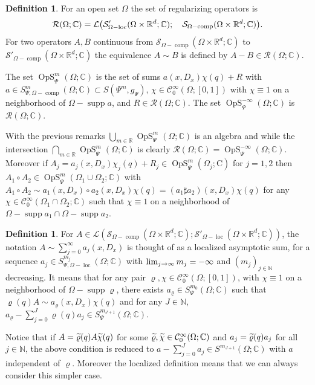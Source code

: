 \documentclass[10pt]{amsart}
\theoremstyle{definition}\newtheorem{defi}[theo]{Definition}\newtheorem{rema}[theo]{Remark}\newtheorem{exam}[theo]{Example}\newtheorem{exem}[theo]{Example}\newtheorem{nota}[theo]{Notation}
\newcommand{\C}{\mathbb{C}}
\newcommand{\R}{\mathbb{R}}
\newcommand{\N}{\mathbb{N}}
\newcommand{\rmC}{\mathrm{C}}
\newcommand{\clC}{\mathcal{C}}
\newcommand{\clS}{\mathcal{S}}
\newcommand{\clL}{\mathcal{L}}
\newcommand{\clR}{\mathcal{R}}
\DeclareMathOperator{\OpS}{OpS}
\DeclareMathOperator{\ccomp}{comp}
\DeclareMathOperator{\suppp}{supp}
\DeclareMathOperator{\locc}{loc}
\let\oldtilde\tilde
\renewcommand*{\tilde}[1]{\mathchoice{\widetilde{#1}}{\widetilde{#1}}{\oldtilde{#1}}{\oldtilde{#1}}}
\let\originalleft\left
\let\originalright\right
\renewcommand{\left}{\mathopen{}\mathclose\bgroup\originalleft}
\renewcommand{\right}{\aftergroup\egroup\originalright}
\renewcommand*{\to}{\mathchoice{\longrightarrow}{\rightarrow}{\rightarrow}{\rightarrow}}
\begin{document}
\begin{defi}\label{def:ROmega}
For an open set $\Omega$ the set of regularizing operators is
\[
\clR(\Omega;\C)=\clL\left(\clS'_{\Omega-\locc}(\Omega\times\R^{d};\C);\quad \clS_{\Omega-\ccomp}(\Omega\times\R^{d};\C)\right).
\]
For two operators $A,B$ continuous from $\clS_{\Omega-\ccomp}(\Omega\times\R^{d};\C)$ to $\clS'_{\Omega-\ccomp}(\Omega\times\R^{d};\C)$ the equivalence $A\sim B$ is defined by $A-B\in \clR(\Omega;\C)$.

The set $\OpS^{m}_{\Psi}(\Omega;\C)$ is the set of sums $a(x,D_{x})\chi(q)+R$ with $a\in S^{m}_{\Psi,\Omega-\ccomp}(\Omega;\C)\subset S(\Psi^{m},g_{\Psi})$, $\chi\in \clC^{\infty}_{0}(\Omega;[0,1])$ with $\chi\equiv 1$ on a neighborhood of $\Omega-\suppp a$, and $R\in \clR(\Omega;\C)$. The set $\OpS^{-\infty}_{\Psi}(\Omega;\C)$ is $\clR(\Omega;\C)$.
\end{defi}

With the previous remarks $\bigcup_{m\in \R}\OpS^{m}_{\Psi}(\Omega;\C)$ is an algebra and while the intersection $\bigcap_{m\in \R}\OpS^{m}_{\Psi}(\Omega;\C)$ is clearly $\clR(\Omega;\C)=\OpS^{-\infty}_{\Psi}(\Omega;\C)$. Moreover if $A_{j}=a_{j}(x,D_{x})\chi_{j}(q)+R_{j}\in \OpS^{m}_{\Psi}(\Omega_{j};\rmC)$ for $j=1,2$ then $A_{1}\circ A_{2}\in \OpS^{m}_{\Psi}(\Omega_{1}\cup \Omega_{2};\C)$ with $A_{1}\circ A_{2}\sim a_{1}(x,D_{x})\circ a_{2}(x,D_{x})\chi(q)=(a_{1}\sharp a_{2})(x,D_{x})\chi(q)$ for any $\chi\in \clC^{\infty}_{0}(\Omega_{1}\cap \Omega_{2};\C)$ such that $\chi\equiv 1$ on a neighborhood of $\Omega-\suppp a_{1}\cap \Omega-\suppp a_{2}$.

\begin{defi}\label{def:asympsum}
For $A\in \clL(\clS_{\Omega-\ccomp}(\Omega\times\R^{d};\C);\clS'_{\Omega-\locc}(\Omega\times\R^{d};\C))$, the notation $A\sim \sum_{j=0}^{\infty}a_{j}(x,D_{x})$ is thought of as a localized asymptotic sum, for a sequence $a_{j}\in S^{m_{j}}_{\Psi,\Omega-\locc}(\Omega;\C)$ with $\lim_{j\to\infty}m_{j}=-\infty$ and $(m_{j})_{j\in\N}$ decreasing. It means that for any pair $\varrho,\chi\in \clC^{\infty}_{0}(\Omega;[0,1])$, with $\chi\equiv 1$ on a neighborhood of $\Omega-\suppp\varrho$, there exists $a_{\varrho}\in S^{m_{0}}_{\Psi}(\Omega;\C)$ such that $\varrho(q)A\sim a_{\varrho}(x,D_{x})\chi(q)$ and for any $J\in \N$, $a_{\varrho}-\sum_{j=0}^{J}\varrho(q)a_{j}\in S^{m_{J+1}}_{\Psi}(\Omega;\C)$.
\end{defi}

Notice that if $A=\tilde{\varrho}(q)A\tilde{\chi}(q)$ for some $\tilde{\varrho},\tilde{\chi}\in \clC^{\infty}_{0}(\Omega;\C)$ and $a_{j}=\tilde{\varrho}(q)a_{j}$ for all $j\in\N$, the above condition is reduced to $a-\sum_{j=0}^{J}a_{j}\in S^{m_{J+1}}(\Omega;\C)$ with $a$ independent of $\varrho$. Moreover the localized definition means that we can always consider this simpler case.
\end{document}
